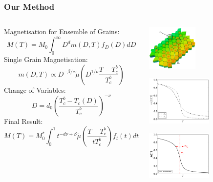 \documentclass{beamer}
\begin{document}
\begin{frame}
	\frametitle{Our Method}
	\begin{columns}
	\column{8cm}
	\small{
	\newline
	Magnetisation for Ensemble of Grains:
	$$
	M(T) = M_0\int_0^\infty D^{d} m(D,T) f_D(D) dD
	$$
	Single Grain Magnetisation:
	$$
	m(D,T) \propto D^{-\beta/\nu} \tilde{\mu} \left(D^{1/\nu}\frac{T-T_c^b}{T_c^b}\right)
	$$
	Change of Variables:
	$$
	D = d_0\left(\frac{T_c^b - T_c(D)}{T_c^b}\right)^{-\nu}
	$$
	Final Result:
	$$
	M(T) = M_0^*\int_0^1 t^{-d\nu +\beta} \tilde{\mu}\left(\frac{T-T_c^b}{tT_c^b}\right) f_t(t) dt
	$$}
	\column{4cm}
	\begin{center}
	\includegraphics[width=2.5cm]{Images/grains2}

	\includegraphics[width=3.25cm]{Images/Ds_noinset}

	\includegraphics[width=3.25cm]{Images/Aggregate}
	\end{center}
	\end{columns}
\end{frame}
\end{document}
